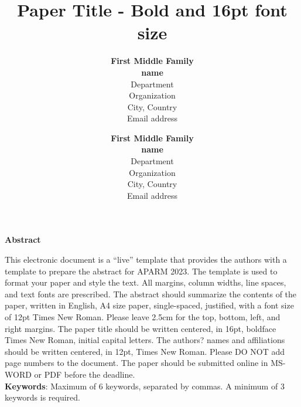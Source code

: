 \documentclass[a4paper,12pt]{article}
\title{\textbf{Paper Title - Bold and 16pt font size}}
\author{
\textbf{First Middle Family}\\
\textbf{name}\\
Department\\
Organization\\
City, Country\\
Email address
        \and
\textbf{First Middle Family}\\
\textbf{name}\\
Department\\
Organization\\
City, Country\\
Email address
}
\date{}
\begin{document}
\maketitle
\thispagestyle{fancy}
\renewcommand{\headrulewidth}{0pt} 
\fancyhead{}
\fancyfoot{}

\begin{center}
	\textbf{\large Abstract}
\end{center}
\noindent This electronic document is a ``live'' template that provides the authors with a template to prepare the abstract for APARM 2023. The template is used to format your paper and style the text. All margins, column widths, line spaces, and text fonts are prescribed. The abstract should summarize the contents of the paper, written in English, A4 size paper, single-spaced, justified, with a font size of 12pt Times New Roman. Please leave 2.5cm for the top, bottom, left, and right margins. The paper title should be written centered, in 16pt, boldface Times New Roman, initial capital letters. The authors? names and affiliations should be written centered, in 12pt, Times New Roman. Please DO NOT add page numbers to the document. The paper should be submitted online in MS-WORD or PDF before the deadline.\\

\noindent \textbf{Keywords}:	Maximum of 6 keywords, separated by commas. A minimum of 3 keywords is required.
\end{document}
